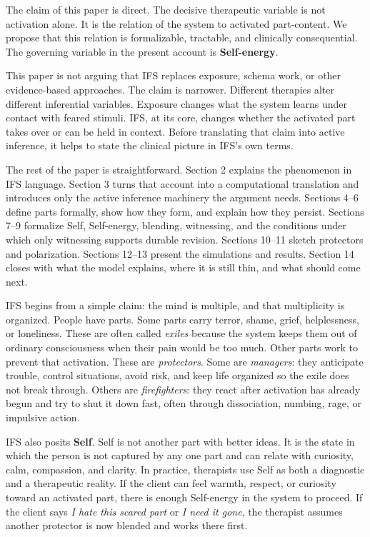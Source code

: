 \documentclass[11pt,a4paper]{article}
\makeatletter
\renewcommand\section{\@startsection{section}{1}{0pt}{2.3ex plus 0.6ex minus 0.2ex}{1.1ex plus 0.2ex}{\large\bfseries}}
\makeatother
\begin{document}
The claim of this paper is direct. The decisive therapeutic variable is
not activation alone. It is the relation of the system to activated
part-content. We propose that this relation is formalizable, tractable,
and clinically consequential. The governing variable in the present
account is \textbf{Self-energy}.

This paper is not arguing that IFS replaces exposure, schema work, or
other evidence-based approaches. The claim is narrower. Different
therapies alter different inferential variables. Exposure changes what
the system learns under contact with feared stimuli. IFS, at its core,
changes whether the activated part takes over or can be held in context.
Before translating that claim into active inference, it helps to state
the clinical picture in IFS's own terms.

The rest of the paper is straightforward. Section 2 explains the
phenomenon in IFS language. Section 3 turns that account into a
computational translation and introduces only the active inference
machinery the argument needs. Sections 4--6 define parts formally, show
how they form, and explain how they persist. Sections 7--9 formalize
Self, Self-energy, blending, witnessing, and the conditions under which
only witnessing supports durable revision. Sections 10--11 sketch
protectors and polarization. Sections 12--13 present the simulations and
results. Section 14 closes with what the model explains, where it is
still thin, and what should come next.

\section{IFS in Its Own Terms}\label{ifs-in-its-own-terms}

IFS begins from a simple claim: the mind is multiple, and that
multiplicity is organized. People have parts. Some parts carry terror,
shame, grief, helplessness, or loneliness. These are often called
\emph{exiles} because the system keeps them out of ordinary
consciousness when their pain would be too much. Other parts work to
prevent that activation. These are \emph{protectors}. Some are
\emph{managers}: they anticipate trouble, control situations, avoid
risk, and keep life organized so the exile does not break through.
Others are \emph{firefighters}: they react after activation has already
begun and try to shut it down fast, often through dissociation, numbing,
rage, or impulsive action.

IFS also posits \textbf{Self}. Self is not another part with better
ideas. It is the state in which the person is not captured by any one
part and can relate with curiosity, calm, compassion, and clarity. In
practice, therapists use Self as both a diagnostic and a therapeutic
reality. If the client can feel warmth, respect, or curiosity toward an
activated part, there is enough Self-energy in the system to proceed. If
the client says \emph{I hate this scared part} or \emph{I need it gone},
the therapist assumes another protector is now blended and works there
first.
\end{document}
